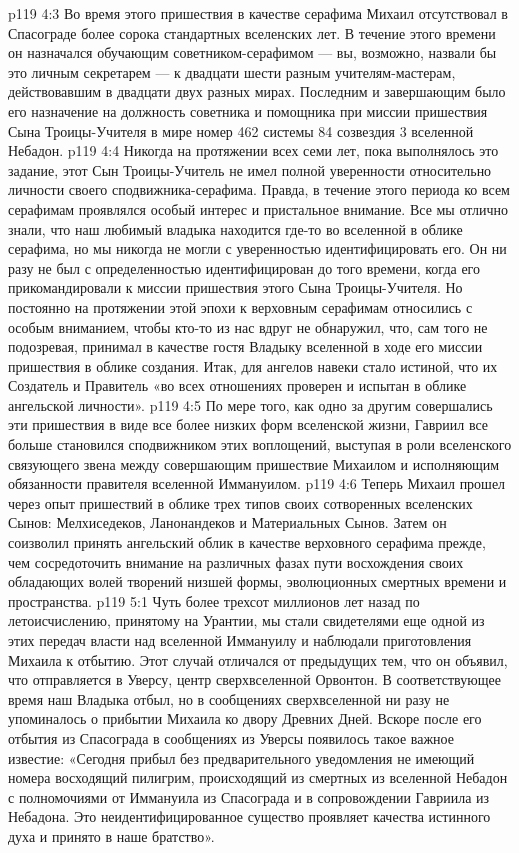 \vs p119 4:3 Во время этого пришествия в качестве серафима Михаил отсутствовал в Спасограде более сорока стандартных вселенских лет. В течение этого времени он назначался обучающим советником\hyp{}серафимом --- вы, возможно, назвали бы это личным секретарем --- к двадцати шести разным учителям\hyp{}мастерам, действовавшим в двадцати двух разных мирах. Последним и завершающим было его назначение на должность советника и помощника при миссии пришествия Сына Троицы\hyp{}Учителя в мире номер 462 системы 84 созвездия 3 вселенной Небадон.
\vs p119 4:4 Никогда на протяжении всех семи лет, пока выполнялось это задание, этот Сын Троицы\hyp{}Учитель не имел полной уверенности относительно личности своего сподвижника\hyp{}серафима. Правда, в течение этого периода ко всем серафимам проявлялся особый интерес и пристальное внимание. Все мы отлично знали, что наш любимый владыка находится где\hyp{}то во вселенной в облике серафима, но мы никогда не могли с уверенностью идентифицировать его. Он ни разу не был с определенностью идентифицирован до того времени, когда его прикомандировали к миссии пришествия этого Сына Троицы\hyp{}Учителя. Но постоянно на протяжении этой эпохи к верховным серафимам относились с особым вниманием, чтобы кто\hyp{}то из нас вдруг не обнаружил, что, сам того не подозревая, принимал в качестве гостя Владыку вселенной в ходе его миссии пришествия в облике создания. Итак, для ангелов навеки стало истиной, что их Создатель и Правитель «во всех отношениях проверен и испытан в облике ангельской личности».
\vs p119 4:5 По мере того, как одно за другим совершались эти пришествия в виде все более низких форм вселенской жизни, Гавриил все больше становился сподвижником этих воплощений, выступая в роли вселенского связующего звена между совершающим пришествие Михаилом и исполняющим обязанности правителя вселенной Иммануилом.
\vs p119 4:6 \pc Теперь Михаил прошел через опыт пришествий в облике трех типов своих сотворенных вселенских Сынов: Мелхиседеков, Ланонандеков и Материальных Сынов. Затем он соизволил принять ангельский облик в качестве верховного серафима прежде, чем сосредоточить внимание на различных фазах пути восхождения своих обладающих волей творений низшей формы, эволюционных смертных времени и пространства.
\vs p119 5:1 Чуть более трехсот миллионов лет назад по летоисчислению, принятому на Урантии, мы стали свидетелями еще одной из этих передач власти над вселенной Иммануилу и наблюдали приготовления Михаила к отбытию. Этот случай отличался от предыдущих тем, что он объявил, что отправляется в Уверсу, центр сверхвселенной Орвонтон. В соответствующее время наш Владыка отбыл, но в сообщениях сверхвселенной ни разу не упоминалось о прибытии Михаила ко двору Древних Дней. Вскоре после его отбытия из Спасограда в сообщениях из Уверсы появилось такое важное известие: «Сегодня прибыл без предварительного уведомления не имеющий номера восходящий пилигрим, происходящий из смертных из вселенной Небадон с полномочиями от Иммануила из Спасограда и в сопровождении Гавриила из Небадона. Это неидентифицированное существо проявляет качества истинного духа и принято в наше братство».
